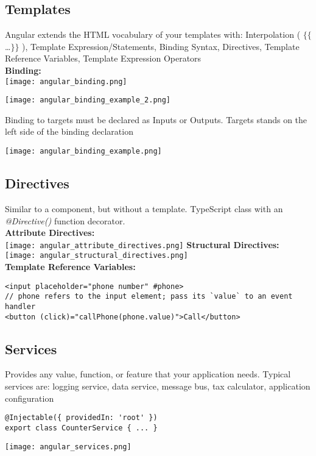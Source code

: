 \subsection{Templates}
Angular extends the HTML vocabulary of your templates with: Interpolation ( $\{\{$\ldots$\}\}$ ), Template Expression/Statements, Binding Syntax, Directives, Template Reference Variables, Template Expression Operators\\
\textcolor{b}{\textbf{Binding:}}\\
\texttt{[image: angular\_binding.png]}
\begin{minipage}{0.5\linewidth}
    \texttt{[image: angular\_binding\_example\_2.png]}
\end{minipage}
\begin{minipage}{0.5\linewidth}
    Binding to targets must be declared as Inputs or Outputs. Targets stands on the left side of the binding declaration
\end{minipage}
\texttt{[image: angular\_binding\_example.png]}
\subsection{Directives}
Similar to a component, but without a template. TypeScript class with an \textit{@Directive()} function decorator.\\
\textcolor{b}{\textbf{Attribute Directives:}}\\
\texttt{[image: angular\_attribute\_directives.png]}
\textcolor{b}{\textbf{Structural Directives:}}\\
\texttt{[image: angular\_structural\_directives.png]}\\
\textcolor{b}{\textbf{Template Reference Variables:}}
\begin{lstlisting}[style=htmlcssjs]
<input placeholder="phone number" #phone>
// phone refers to the input element; pass its `value` to an event handler
<button (click)="callPhone(phone.value)">Call</button>
\end{lstlisting}
\subsection{Services}
Provides any value, function, or feature that your application needs. Typical services are: logging service, data service, message bus, tax calculator, application configuration
\begin{lstlisting}[style=htmlcssjs]
@Injectable({ providedIn: 'root' })
export class CounterService { ... }
\end{lstlisting}
\texttt{[image: angular\_services.png]}
